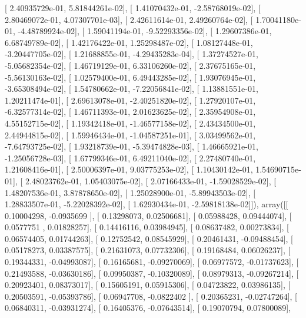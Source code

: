 \documentclass{article}
\begin{document}
       [  2.40935729e-01,   5.81844261e-02],
       [  1.41070432e-01,  -2.58768019e-02],
       [  2.80469072e-01,   4.07307701e-03],
       [  2.42611614e-01,   2.49260764e-02],
       [  1.70041180e-01,  -4.48789924e-02],
       [  1.59041194e-01,  -9.52293356e-02],
       [  1.29607386e-01,   6.68749789e-02],
       [  1.42176422e-01,   1.25298487e-02],
       [  1.08127448e-01,  -3.20447705e-02],
       [  1.21688855e-01,  -4.29435283e-04],
       [  1.37274527e-01,  -5.05682354e-02],
       [  1.46719129e-01,   6.33106260e-02],
       [  2.37675165e-01,  -5.56130163e-02],
       [  1.02579400e-01,   6.49443285e-02],
       [  1.93076945e-01,  -3.65308494e-02],
       [  1.54780662e-01,  -7.22056841e-02],
       [  1.13881551e-01,   1.20211474e-01],
       [  2.69613078e-01,  -2.40251820e-02],
       [  1.27920107e-01,  -6.32577314e-02],
       [  1.46711393e-01,   2.01623625e-02],
       [  2.35954908e-01,   4.55152715e-02],
       [  1.19342418e-01,  -1.46577158e-02],
       [  2.43434500e-01,   2.44944815e-02],
       [  1.59946434e-01,  -1.04587251e-01],
       [  3.03499562e-01,  -7.64793725e-02],
       [  1.93218739e-01,  -5.39474828e-03],
       [  1.46665921e-01,  -1.25056728e-03],
       [  1.67799346e-01,   6.49211040e-02],
       [  2.27480740e-01,   1.21608416e-01],
       [  2.50006397e-01,   9.03775253e-02],
       [  1.10430142e-01,   1.54690715e-01],
       [  2.48023762e-01,   1.05403075e-02],
       [  2.07166433e-01,  -1.59028529e-02],
       [  1.48207536e-01,   3.87878650e-02],
       [  1.25028900e-01,  -5.89943503e-02],
       [  1.28833507e-01,  -5.22028392e-02],
       [  1.62930434e-01,  -2.59818138e-02]]), array([[ 0.10004298, -0.0935699 ],
       [ 0.13298073,  0.02506681],
       [ 0.05988428,  0.09444074],
       [ 0.0577751 ,  0.01828257],
       [ 0.14416116,  0.03984945],
       [ 0.08637482,  0.00273834],
       [ 0.06574405,  0.01744263],
       [ 0.12752542,  0.08545929],
       [ 0.20461431, -0.09488454],
       [ 0.05178273,  0.03387575],
       [ 0.21631073,  0.07732306],
       [ 0.19168484,  0.06026237],
       [ 0.19344331, -0.04993087],
       [ 0.16165681, -0.09270069],
       [ 0.06977572, -0.01737623],
       [ 0.21493588, -0.03630186],
       [ 0.09950387, -0.10320089],
       [ 0.08979313, -0.09267214],
       [ 0.20923401,  0.08373017],
       [ 0.15605191,  0.05915306],
       [ 0.04723822,  0.03986135],
       [ 0.20503591, -0.05393786],
       [ 0.06947708, -0.0822402 ],
       [ 0.20365231, -0.02747264],
       [ 0.06840311, -0.03931274],
       [ 0.16405376, -0.07643514],
       [ 0.19070794,  0.07800089],
\end{document}
